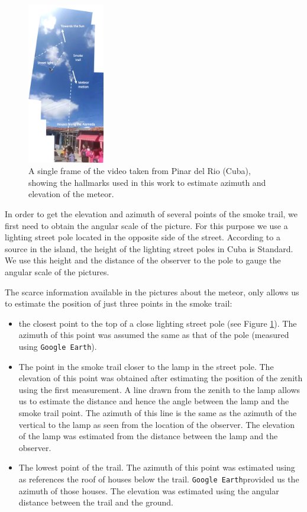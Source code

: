 \documentclass[fleqn,usenatbib]{mnras}
\newcommand{\GoogleEarth}{{\tt Google Earth}}
\begin{document}
\begin{figure}  
\centering
\includegraphics[width=0.3\textwidth]{picture-pinar-vp.png}
\caption{A single frame of the video taken from Pinar del Rio (Cuba), showing the hallmarks used in this work to estimate azimuth and elevation of the meteor.}
\label{fig:pinar}
\end{figure}

In order to get the elevation and azimuth of several points of the smoke trail, we first need to obtain the angular scale of the picture.  For this purpose we use a lighting street pole located in the opposite side of the street.  According to a source in the island, the height of the lighting street poles in Cuba is Standard. We use this height and the distance of the observer to the pole to gauge the angular scale of the pictures.

The scarce information available in the pictures about the meteor, only allows us to estimate the position of just three points in the smoke trail:

\begin{itemize}
    \item the closest point to the top of a close lighting street pole (see Figure \ref{fig:pinar}). The azimuth of this point was assumed the same as that of the pole (measured using \GoogleEarth).
    \item The point in the smoke trail closer to the lamp in the street pole.  The elevation of this point was obtained after estimating the position of the zenith using the first measurement. A line drawn from the zenith to the lamp allows us to estimate the distance and hence the angle between the lamp and the smoke trail point. The azimuth of this line is the same as the azimuth of the vertical to the lamp as seen from the location of the observer.  The elevation of the lamp was estimated from the distance between the lamp and the observer. 
    \item The lowest point of the trail.  The azimuth of this point was estimated using as references the roof of houses below the trail. \GoogleEarth provided us the azimuth of those houses.  The elevation was estimated using the angular distance between the trail and the ground.
\end{itemize}  
\end{document}
